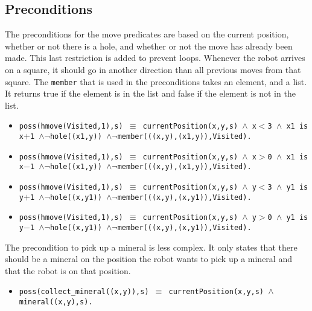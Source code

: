 \documentclass{article}
\begin{document}
\subsection{Preconditions}
The preconditions for the move predicates are based on the current position, whether or not there is a hole, and whether or not the move has already been made. This last restriction is added to prevent loops. Whenever the robot arrives on a square, it should go in another direction than all previous moves from that square. The \texttt{member} that is used in the preconditions takes an element, and a list. It returns true if the element is in the list and false if the element is not in the list.
\begin{itemize}
\item \texttt{poss(hmove(Visited,1),s) $\equiv$ currentPosition(x,y,s) $\wedge$ x$<$3 $\wedge$ x1 is x$+$1 $\wedge  \neg$hole((x1,y)) $\wedge \neg$member(((x,y),(x1,y)),Visited).}
\item \texttt{poss(hmove(Visited,1),s) $\equiv$ currentPosition(x,y,s) $\wedge$ x$>$0 $\wedge$ x1 is x$-$1 $\wedge  \neg$hole((x1,y)) $\wedge \neg$member(((x,y),(x1,y)),Visited).}
\item \texttt{poss(hmove(Visited,1),s) $\equiv$ currentPosition(x,y,s) $\wedge$ y$<$3 $\wedge$ y1 is y$+$1 $\wedge  \neg$hole((x,y1)) $\wedge \neg$member(((x,y),(x,y1)),Visited).}
\item \texttt{poss(hmove(Visited,1),s) $\equiv$ currentPosition(x,y,s) $\wedge$ y$>$0 $\wedge$ y1 is y$-$1 $\wedge  \neg$hole((x,y1)) $\wedge \neg$member(((x,y),(x,y1)),Visited).}
\end{itemize}

The precondition to pick up a mineral is less complex. It only states that there should be a mineral on the position the robot wants to pick up a mineral and that the robot is on that position.
\begin{itemize}
\item \texttt{poss(collect\_mineral((x,y)),s) $\equiv$ currentPosition(x,y,s) $\wedge$ \\ mineral((x,y),s).}
\end{itemize}
\end{document}
